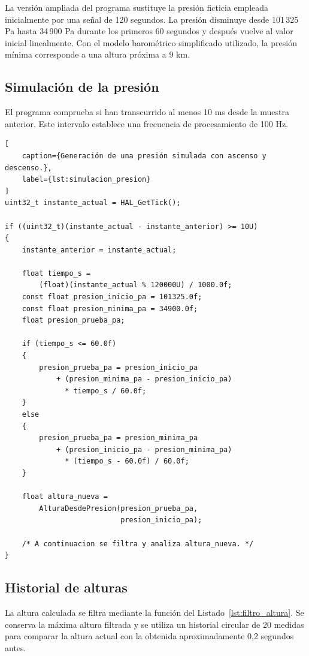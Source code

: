 \documentclass[11pt,a4paper]{article}
\begin{document}
La versión ampliada del programa sustituye la presión ficticia
empleada inicialmente por una señal de 120 segundos. La presión
disminuye desde 101\,325 Pa hasta 34\,900 Pa durante los primeros
60 segundos y después vuelve al valor inicial linealmente. Con el modelo
barométrico simplificado utilizado, la presión mínima corresponde
a una altura próxima a 9 km.

\subsection{Simulación de la presión}

El programa comprueba si han transcurrido al menos 10 ms desde la
muestra anterior. Este intervalo establece una frecuencia
de procesamiento de 100 Hz.

\begin{lstlisting}[
    caption={Generación de una presión simulada con ascenso y descenso.},
    label={lst:simulacion_presion}
]
uint32_t instante_actual = HAL_GetTick();

if ((uint32_t)(instante_actual - instante_anterior) >= 10U)
{
    instante_anterior = instante_actual;

    float tiempo_s =
        (float)(instante_actual % 120000U) / 1000.0f;
    const float presion_inicio_pa = 101325.0f;
    const float presion_minima_pa = 34900.0f;
    float presion_prueba_pa;

    if (tiempo_s <= 60.0f)
    {
        presion_prueba_pa = presion_inicio_pa
            + (presion_minima_pa - presion_inicio_pa)
              * tiempo_s / 60.0f;
    }
    else
    {
        presion_prueba_pa = presion_minima_pa
            + (presion_inicio_pa - presion_minima_pa)
              * (tiempo_s - 60.0f) / 60.0f;
    }

    float altura_nueva =
        AlturaDesdePresion(presion_prueba_pa,
                           presion_inicio_pa);

    /* A continuacion se filtra y analiza altura_nueva. */
}
\end{lstlisting}

\subsection{Historial de alturas}

La altura calculada se filtra mediante la función del
Listado~\ref{lst:filtro_altura}. Se conserva la máxima altura
filtrada y se utiliza un historial circular de 20 medidas para
comparar la altura actual con la obtenida aproximadamente
0,2 segundos antes.
\end{document}
